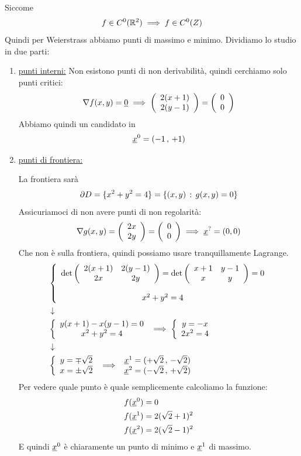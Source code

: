 \begin{enumerate}
	Siccome
	\begin{align}
		f\in C^0(\mathbb{R}^2) \implies f\in C^0(Z)
	\end{align}
	Quindi per Weierstrass abbiamo punti di massimo e minimo. Dividiamo lo studio in due parti:
	\begin{enumerate}
		\item \underline{punti interni:}
		Non esistono punti di non derivabilità, quindi cerchiamo solo punti critici:
		\begin{align}
			\nabla f(x,y) = \underline{0} \implies \left( \begin{array}{cc} 2(x+1) \\ 2(y-1) \end{array} \right) = \left( \begin{array}{cc} 0 \\ 0 \end{array} \right)
		\end{align}
		Abbiamo quindi un candidato in
		\begin{align}
			\underline{x}^0=(-1 \, , \, +1)
		\end{align}
		
		\item \underline{punti di frontiera:}
		
		La frontiera sarà 
		\begin{align}
			\partial D = \{ x^2 +y^2 =4 \}= \{ (x,y) \, : \, g(x,y)=0 \}
		\end{align}
		Assicuriamoci di non avere punti di non regolarità:
		\begin{align}
			\nabla g(x,y)= \left( \begin{array}{cc} 2x \\ 2y \end{array} \right) =  \left( \begin{array}{cc} 0 \\ 0 \end{array} \right) \implies \underline{x}^?=(0,0)
		\end{align}
		Che non è sulla frontiera, quindi possiamo usare tranquillamente Lagrange.
		\begin{align}
			{}&\left\{\begin{array}{cc}   \det \left( \begin{array}{ccc} 2(x+1) & 2(y-1) \\ 2x & 2y \end{array} \right) = \det \left( \begin{array}{ccc} x+1 & y-1 \\ x & y \end{array} \right) =0  \\ \quad \\ x^2 +y^2 =4 \end{array}\right. \nonumber \\ &\downarrow \nonumber \\
			& \left\{\begin{array}{cc} y(x+1) - x(y-1)=0 \\ x^2 +y^2 =4 \end{array}\right. \implies \left\{\begin{array}{cc} y=-x \\ 2x^2=4 \end{array}\right. \nonumber \\ &\downarrow \nonumber \\ 
			&\left\{\begin{array}{cc} y=\mp \sqrt{2} \\ x=\pm\sqrt{2} \end{array}\right. \implies \begin{array}{cc}
				\underline{x}^1 = (+ \sqrt{2} \, , \, -\sqrt{2})\\
				\underline{x}^2 = (- \sqrt{2} \, , \, +\sqrt{2})
			\end{array}
		\end{align}
		Per vedere quale punto è quale semplicemente calcoliamo la funzione:
		\begin{align}
			{}&f(\underline{x}^0)=0\\
			&f(\underline{x}^1)= 2 (\sqrt{2} + 1)^2\\
			&f(\underline{x}^2)=2 (\sqrt{2} - 1)^2
		\end{align}
		E quindi $\underline{x}^0$ è chiaramente un punto di minimo e $\underline{x}^1$ di massimo.
	\end{enumerate}
\end{enumerate}

